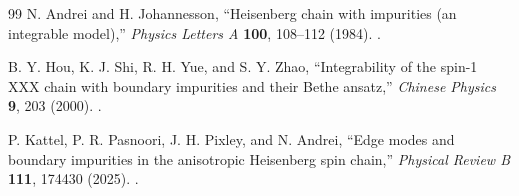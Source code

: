 \documentclass[11pt,a4paper]{article}
\begin{document}
\begin{thebibliography}{99}
N. Andrei and H. Johannesson,
``Heisenberg chain with impurities (an integrable model),''
\emph{Physics Letters A} \textbf{100}, 108--112 (1984).
.

B. Y. Hou, K. J. Shi, R. H. Yue, and S. Y. Zhao,
``Integrability of the spin-1 XXX chain with boundary impurities and their Bethe ansatz,''
\emph{Chinese Physics} \textbf{9}, 203 (2000).
.

P. Kattel, P. R. Pasnoori, J. H. Pixley, and N. Andrei,
``Edge modes and boundary impurities in the anisotropic Heisenberg spin chain,''
\emph{Physical Review B} \textbf{111}, 174430 (2025).
.

\end{thebibliography}
\end{document}
